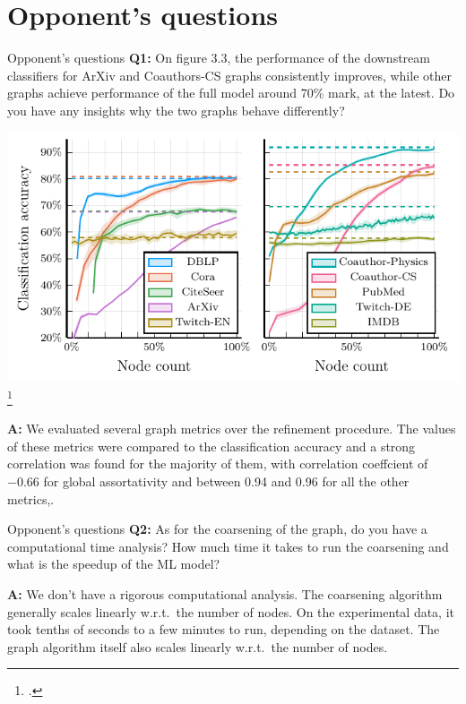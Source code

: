 \documentclass[10pt]{beamer}
\begin{document}
\begin{frame}
	\titlepage
\end{frame}

\appendix

\section{Opponent's questions}

\begin{frame}{Opponent's questions}
	\textbf{Q1:} On figure 3.3, the performance of the downstream classifiers for ArXiv and Coauthors-CS graphs consistently improves, while other graphs achieve performance of the full model around 70\% mark, at the latest. Do you have any insights why the two graphs behave differently?
	\begin{center}
		\includegraphics[width=0.5\pagewidth]{images/adaptive-coarsening/adaptive-coarsening.pdf}\footcite{dedic_balancing_2024}
	\end{center}

	\textbf{A:} We evaluated several graph metrics over the refinement procedure. The values of these metrics were compared to the classification accuracy and a strong correlation was found for the majority of them, with correlation coeffcient of −0.66 for global assortativity and between 0.94 and 0.96 for all the other metrics,.
\end{frame}

\begin{frame}{Opponent's questions}
	\textbf{Q2:} As for the coarsening of the graph, do you have a computational time analysis? How much time it takes to run the coarsening and what is the speedup of the ML model?

	\textbf{A:} We don't have a rigorous computational analysis. The coarsening algorithm generally scales linearly w.r.t.\ the number of nodes. On the experimental data, it took tenths of seconds to a few minutes to run, depending on the dataset. The graph algorithm itself also scales linearly w.r.t.\ the number of nodes.
\end{frame}
\end{document}
